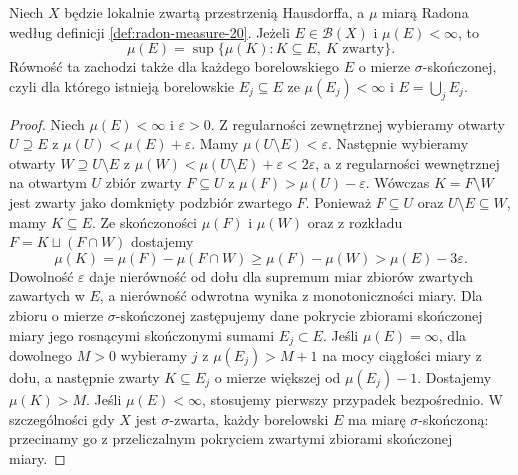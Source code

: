 \begin{lemat}
\label{lem:radon-sigmafinite-inner-20}
Niech $X$ będzie lokalnie zwartą przestrzenią Hausdorffa,
a $\mu$ miarą Radona według definicji
\ref{def:radon-measure-20}. Jeżeli $E\in\mathcal B(X)$
i $\mu(E)<\infty$, to
\[
 \mu(E)=\sup\{\mu(K):K\subseteq E,\ K\text{ zwarty}\}.
\]
Równość ta zachodzi także dla każdego borelowskiego
$E$ o mierze $\sigma$-skończonej, czyli dla którego
istnieją borelowskie $E_j\subseteq E$ ze
$\mu(E_j)<\infty$ i $E=\bigcup_jE_j$.
\end{lemat}
\begin{proof}
Niech $\mu(E)<\infty$ i $\varepsilon>0$.
Z regularności zewnętrznej wybieramy otwarty
$U\supseteq E$ z $\mu(U)<\mu(E)+\varepsilon$.
Mamy $\mu(U\setminus E)<\varepsilon$.
Następnie wybieramy otwarty $W\supseteq U\setminus E$
z $\mu(W)<\mu(U\setminus E)+\varepsilon<2\varepsilon$,
a z regularności wewnętrznej na otwartym $U$ zbiór zwarty
$F\subseteq U$ z $\mu(F)>\mu(U)-\varepsilon$.
Wówczas $K=F\setminus W$ jest zwarty jako domknięty
podzbiór zwartego $F$. Ponieważ $F\subseteq U$
oraz $U\setminus E\subseteq W$, mamy $K\subseteq E$.
Ze skończoności $\mu(F)$ i $\mu(W)$ oraz z rozkładu
$F=K\sqcup(F\cap W)$ dostajemy
\[
 \mu(K)=\mu(F)-\mu(F\cap W)
 \ge\mu(F)-\mu(W)>\mu(E)-3\varepsilon.
\]
Dowolność $\varepsilon$ daje nierówność od dołu
dla supremum miar zbiorów zwartych zawartych w $E$,
a nierówność odwrotna wynika z monotoniczności miary.
Dla zbioru o mierze $\sigma$-skończonej zastępujemy dane pokrycie zbiorami skończonej miary jego rosnącymi skończonymi sumami $E_j\subset E$. Jeśli $\mu(E)=\infty$, dla dowolnego $M>0$ wybieramy $j$ z $\mu(E_j)>M+1$ na mocy ciągłości miary z dołu, a następnie zwarty $K\subseteq E_j$ o mierze większej od $\mu(E_j)-1$. Dostajemy $\mu(K)>M$. Jeśli $\mu(E)<\infty$, stosujemy pierwszy przypadek bezpośrednio. W szczególności gdy $X$ jest $\sigma$-zwarta, każdy borelowski $E$ ma miarę $\sigma$-skończoną: przecinamy go z przeliczalnym pokryciem zwartymi zbiorami skończonej miary.
\end{proof}

